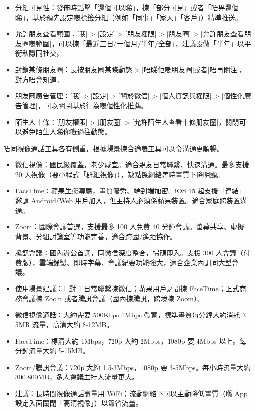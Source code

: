
\begin{itemize}
  \item 分組可見性：發佈時點擊「邊個可以睇」，揀「部分可見」或者「唔畀邊個睇」，基於預先設定嘅標籤分組（例如「同事」「家人」「客戶」）精準推送。
  \item 允許朋友查看範圍：[我] > [設定] > [朋友權限] > [朋友圈] > [允許朋友查看朋友圈嘅範圍]，可以揀「最近三日/一個月/半年/全部」，建議設做「半年」以平衡私隱同社交。
  \item 封鎖某條朋友圈：長按朋友圈某條動態 > [唔睇佢嘅朋友圈]或者[唔再關注]，對方唔會知道。
  \item 朋友圈廣告管理：[我] > [設定] > [關於微信] > [個人資訊與權限] > [個性化廣告管理]，可以關閉基於行為嘅個性化推薦。
  \item 陌生人十條：[朋友權限] > [朋友圈] > [允許陌生人查看十條朋友圈]，關閉可以避免陌生人睇你嘅過往動態。
\end{itemize}


唔同視像通話工具各有側重，根據場景揀合適嘅工具可以令溝通更順暢。

\begin{itemize}
  \item 微信視像：國民級覆蓋，老少咸宜。適合親友日常聯繫、快速溝通。最多支援 20 人視像（要小程式「群組視像」），缺點係網絡差時畫質下降明顯。
  \item FaceTime：蘋果生態專屬，畫質優秀、端到端加密。iOS 15 起支援「連結」邀請 Android/Web 用戶加入，但主持人必須係蘋果裝置。適合家庭跨裝置溝通。
  \item Zoom：國際會議首選，支援最多 100 人免費 40 分鐘會議。螢幕共享、虛擬背景、分組討論室等功能完善，適合跨國/遙距協作。
  \item 騰訊會議：國內辦公首選，同微信深度整合，掃碼即入。支援 300 人會議（付費版），雲端錄製、即時字幕、會議紀要功能強大，適合企業內訓同大型會議。
  \item 使用場景建議：1 對 1 日常聯繫揀微信；蘋果用戶之間揀 FaceTime；正式商務會議揀 Zoom 或者騰訊會議（國內揀騰訊，跨境揀 Zoom）。
\end{itemize}


\begin{itemize}
  \item 微信視像通話：大約需要 500Kbps-1Mbps 帶寬，標準畫質每分鐘大約消耗 3-5MB 流量，高清大約 8-12MB。
  \item FaceTime：標清大約 1Mbps，720p 大約 2Mbps，1080p 要 4Mbps 以上。每分鐘流量大約 5-15MB。
  \item Zoom/騰訊會議：720p 大約 1.5-3Mbps，1080p 要 3-5Mbps。每小時流量大約 300-800MB，多人會議主持人流量更大。
  \item 建議：長時間視像通話盡量用 WiFi；流動網絡下可以主動降低畫質（喺 App 設定入面關閉「高清視像」）以節省流量。
\end{itemize}

